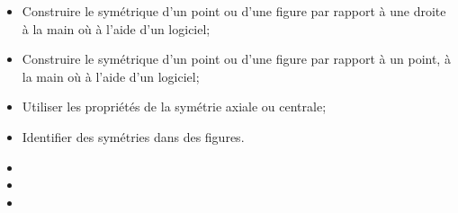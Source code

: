 \begin{myobj}
	\begin{itemize}
		
		\item Construire le symétrique d’un point ou d'une figure par rapport à une droite à la main où à l’aide d’un logiciel;
		\item Construire le symétrique d’un point ou d'une figure par rapport à un point, à la main où à l’aide d’un logiciel;
		\item Utiliser les propriétés de la symétrie axiale ou centrale;
		\item Identifier des symétries dans des figures.		
	\end{itemize}
\end{myobj}

\begin{mycomp}
	\begin{itemize}
		\item {} 
		\item {}
		\item {}
		
	\end{itemize}
\end{mycomp}


